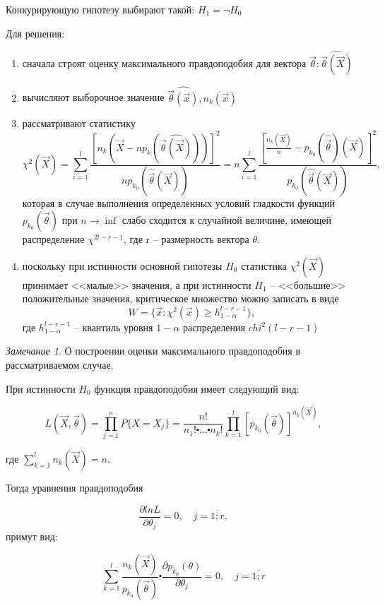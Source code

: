 \documentclass[a4paper, 12pt]{article}
\theoremstyle{definition}
\theoremstyle{leads}
\theoremstyle{example}
\theoremstyle{remark}
\newtheorem{remark}{Замечание}
\begin{document}
Конкурирующую гипотезу выбирают такой: $H_1 = \neg H_0$

Для решения:

\begin{enumerate}
	\item сначала строят оценку максимального правдоподобия для вектора $\vec{\theta} : \hat{\vec{\theta}(\vec{X})}$
	\item вычисляют выборочное значение $\hat{\vec{\theta}(\vec{x})}, n_k(\vec{x})$
	\item рассматривают статистику 
	 \begin{equation*}
	 	\chi^2(\vec{X}) = \sum_{i=1}^{l} \frac{[n_k(\vec{X} - np_k(\hat{\vec{\theta}(\vec{X})}))]^2}{np_{k_0}(\hat{\vec{\theta}}(\vec{X}))} = n \sum_{i=1}^{l}\frac{[\frac{n_k(\vec{X})}{n} - p_{k_0}(\hat{\vec{\theta}})(\vec{X})]^2}{p_{k_0}(\hat{\vec{\theta}}(\vec{X}))},
	 \end{equation*}
	 которая в случае выполнения определенных условий гладкости функций $p_{k_0}(\vec{\theta})$ при $n \longrightarrow \inf$ слабо сходится к случайной величине, имеющей распределение $\chi^{2 l - r - 1}$, где r -- размерность вектора $\theta$.
	 \item поскольку при истинности основной гипотезы $H_0$ статистика $\chi^2(\vec{X})$ принимает <<малые>> значения, а при истинности $H_1$ -- <<большие>> положительные значения, критическое множество можно записать в виде 
	 \begin{equation*}
	 	W = \{\vec{x} : \chi^2(\vec{x}) \geq h_{1 - \alpha}^{l-r-1} \},
	 \end{equation*}
	 где $h_{1 - \alpha}^{l-r-1}$ -- квантиль уровня $1 - \alpha$ распределения $chi^2(l-r-1)$
\end{enumerate}

\begin{remark}
	О построении оценки максимального правдоподобия в рассматриваемом случае.
	
	При истинности $H_0$ функция правдоподобия имеет следующий вид:
	
	\begin{equation*}
		L(\vec{X}, \vec{\theta}) = \prod_{j=1}^{n} P\{X = X_j\} = \frac{n!}{n_1! \centerdot \dots \centerdot n_k!} \prod_{k=1}^{l}[p_{k_0}(\vec{\theta})]^{n_k(\vec{X})},
	\end{equation*}
	
	где  $\sum_{k=1}^{l}n_k(\vec{X}) = n$.
	
	Тогда уравнения правдоподобия
	
	\begin{equation*}
		\frac{\partial ln L}{\partial \theta_j} = 0, \quad j = \overline{1; r},
	\end{equation*}
	примут вид:
	
	\begin{equation*}
		\sum_{k=1}^{l} \frac{n_k(\vec{X})}{p_{k_0}(\vec{\theta})} \centerdot \frac{\partial p_{k_0}(\theta)}{\partial \theta_j} = 0, \quad j = \overline{1; r}
	\end{equation*}
\end{remark}
\end{document}

